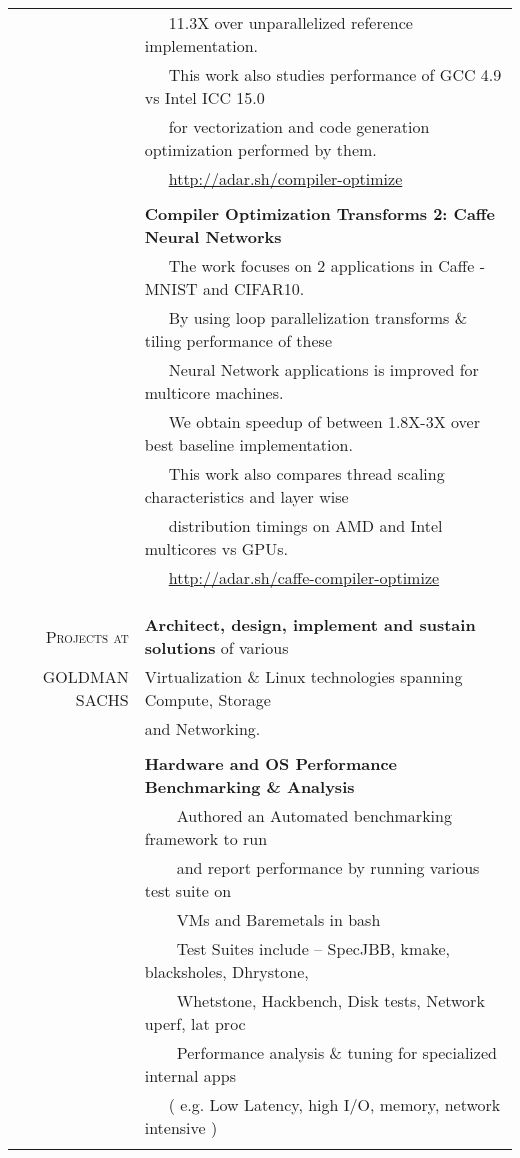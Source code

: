 \documentclass[a4paper,10pt]{article} %
\newcommand{\tabitem}{~~\llap{\textbullet}~~}
\begin{document}
\begin{tabular}{rl}
& ~~~11.3X over unparallelized reference implementation.\\
& ~~~This work also studies performance of GCC 4.9 vs Intel ICC 15.0\\
& ~~~for vectorization and code generation optimization performed by them.\\
& ~~~\href{http://adar.sh/compiler-optimize}{http://adar.sh/compiler-optimize}\\
& \\
& \textbf{Compiler Optimization Transforms 2: Caffe Neural Networks}\\
& ~~~The work focuses on 2 applications in Caffe - MNIST and CIFAR10. \\
& ~~~By using loop parallelization transforms \& tiling performance of these \\
& ~~~Neural Network applications is improved for multicore machines. \\
& ~~~We obtain speedup of between 1.8X-3X over best baseline implementation.\\
& ~~~This work also compares thread scaling characteristics and layer wise \\
& ~~~distribution timings on AMD and Intel multicores vs GPUs.\\
& ~~~\href{http://adar.sh/caffe-compiler-optimize}{http://adar.sh/caffe-compiler-optimize}\\
& \\
&\\
&\\
\textsc{Projects at}  &  \textbf{Architect, design, implement and sustain solutions} of various  \\
\textsc{GOLDMAN SACHS} &  Virtualization \& Linux technologies spanning Compute, Storage \\
& and Networking. \\
&\\
& \textbf{Hardware and OS Performance Benchmarking \& Analysis}\\
& \tabitem Authored an Automated benchmarking framework to run \\
& ~~~~and report performance by running various test suite on \\
& ~~~~VMs and Baremetals in bash\\
& \tabitem Test Suites include – SpecJBB, kmake, blacksholes, Dhrystone, \\
& ~~~~Whetstone, Hackbench, Disk tests, Network uperf, lat proc \\
& \tabitem Performance analysis \& tuning for specialized internal apps \\
& ~~~( e.g. Low Latency, high I/O, memory, network intensive )\\
&\\

\end{tabular}
\end{document}
